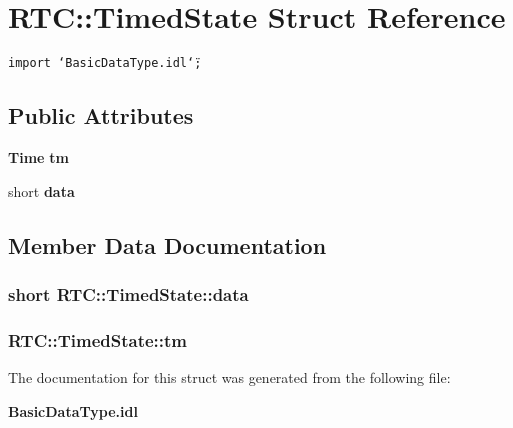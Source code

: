 \section{RTC::Timed\-State Struct Reference}
\label{structRTC_1_1TimedState}
{\tt import \char`\"{}Basic\-Data\-Type.idl\char`\"{};}

\subsection*{Public Attributes}
\begin{CompactItemize}
\item 
{\bf Time} {\bf tm}
\item 
short {\bf data}
\end{CompactItemize}


\subsection{Member Data Documentation}
\subsubsection{\setlength{\rightskip}{0pt plus 5cm}short {\bf RTC::Timed\-State::data}}\label{structRTC_1_1TimedState_RTC_1_1TimedStateo1}


\subsubsection{ {\bf RTC::Timed\-State::tm}}\label{structRTC_1_1TimedState_RTC_1_1TimedStateo0}




The documentation for this struct was generated from the following file:\begin{CompactItemize}
\item 
{\bf Basic\-Data\-Type.idl}\end{CompactItemize}

